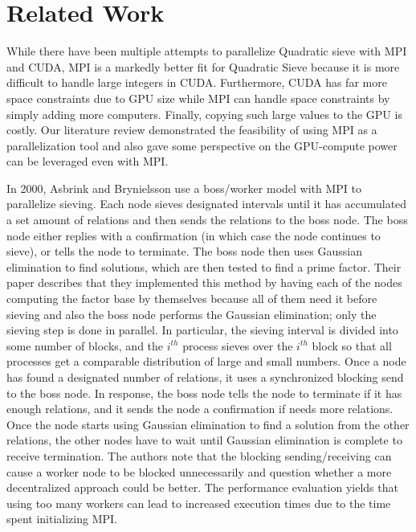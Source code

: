 \documentclass[11pt,twocolumn]{article}
\begin{document}
\section {Related Work}\label{relwork}
\indent While there have been multiple attempts to parallelize Quadratic sieve with MPI and CUDA, MPI is a markedly better fit for Quadratic Sieve because it is more difficult to handle large integers in CUDA. Furthermore, CUDA has far more space constraints due to GPU size while MPI can handle space constraints by simply adding more computers. Finally, copying such large values to the GPU is costly. Our literature review demonstrated the feasibility of using MPI as a parallelization tool and also gave some perspective on the GPU-compute power can be leveraged even with MPI.

\indent In 2000, Asbrink and Brynielsson \cite{asbrink:parallelqs} use a boss/worker model with MPI to parallelize sieving. Each node sieves designated intervals until it has accumulated a set amount of relations and then sends the relations to the boss node. The boss node either replies with a confirmation (in which case the node continues to sieve), or tells the node to terminate. The boss node then uses Gaussian elimination to find solutions, which are then tested to find a prime factor. Their paper describes that they implemented this method by having each of the nodes computing the factor base by themselves because all of them need it before sieving and also the boss node performs the Gaussian elimination; only the sieving step is done in parallel. In particular, the sieving interval is divided into some number of blocks, and the $i^{th}$ process sieves over the $i^{th}$ block so that all processes get a comparable distribution of large and small numbers. Once a node has found a designated number of relations, it uses a synchronized blocking send to the boss node. In response, the boss node tells the node to terminate if it has enough relations, and it sends the node a confirmation if needs more relations. Once the node starts using Gaussian elimination to find a solution from the other relations, the other nodes have to wait until Gaussian elimination is complete to receive termination. The authors note that the blocking sending/receiving can cause a worker node to be blocked unnecessarily and question whether a more decentralized approach could be better. The performance evaluation yields that using too many workers can lead to increased execution times due to the time spent initializing MPI.
\end{document}
